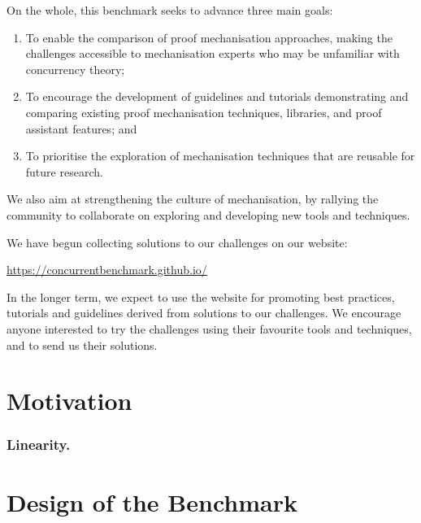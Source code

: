 \documentclass[runningheads]{llncs}
\begin{document}
On the whole, this benchmark seeks to advance three main goals:

\begin{enumerate}[label=\textbf{(G\arabic*)},leftmargin=10mm]
\item\label{item:goal-comperison-accessibility} To enable the comparison of
  proof mechanisation approaches, making the challenges accessible to
  mechanisation experts who may be unfamiliar with concurrency theory;

\item\label{item:goal-tutorials} To encourage the development of guidelines and
  tutorials demonstrating and comparing existing proof mechanisation
  techniques, libraries, and proof assistant features; and

\item\label{item:goal-reusability} To prioritise the exploration of mechanisation
  techniques that are reusable for future research.
\end{enumerate}
We also aim at strengthening the culture of mechanisation, by rallying the
community to collaborate on exploring and developing new tools and techniques.

We have begun collecting solutions to our challenges on our website:
%
\begin{center}
  \url{https://concurrentbenchmark.github.io/}
\end{center}
%
In the longer term, we expect to use the website for promoting best practices,
tutorials and guidelines derived from solutions to our challenges.
We encourage anyone interested to try the challenges using their
favourite tools and techniques, and to send us their solutions.

\section{Motivation}\label{sec:motivation}


\subsubsection{Linearity.}


\section{Design of the Benchmark}\label{sec:design-discussion}
\end{document}
